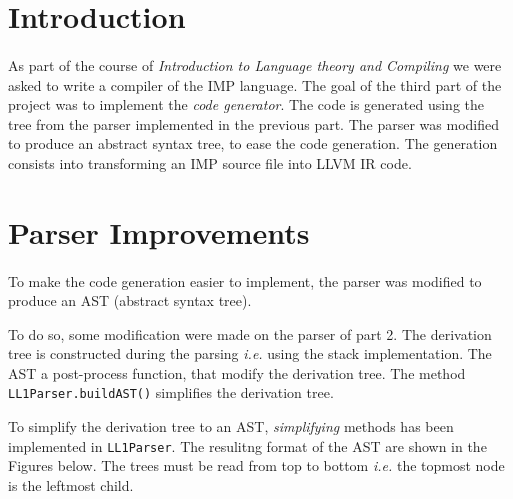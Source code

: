 \documentclass[letterpaper]{article}
\begin{document}
\section{Introduction}

\paragraph{}

As part of the course of \textit{Introduction to Language theory and Compiling}
we were asked to
write a compiler of the IMP language. The goal of the third part of the
project was to implement the \textit{code generator}. The code is
generated using the tree from the parser implemented in the previous part.
The parser was modified to produce an abstract syntax tree, to ease the
code generation. The generation consists into transforming an IMP source file
into LLVM IR code.

\section{Parser Improvements}

\label{simplify}

\paragraph{}

To make the code generation easier to implement, the parser was modified
to produce an AST (abstract syntax tree).

To do so, some modification were made on the parser of part 2. The
derivation tree is constructed during the parsing \textit{i.e.} using
the stack implementation. The AST a post-process function, that modify
the derivation tree. The method \texttt{LL1Parser.buildAST()} simplifies
the derivation tree.

To simplify the derivation tree to an AST, \textit{simplifying} methods
has been implemented in \texttt{LL1Parser}. The resulitng
format of the AST are shown in the Figures below.
The trees
must be read from top to bottom \textit{i.e.} the topmost
node is the leftmost child.
\end{document}
